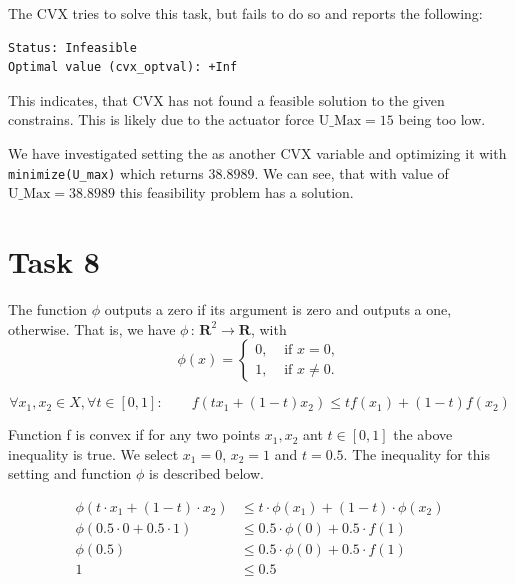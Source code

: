 The CVX tries to solve this task, but fails to do so and reports the following:
\begin{lstlisting}
Status: Infeasible
Optimal value (cvx_optval): +Inf
\end{lstlisting}

This indicates, that CVX has not found a feasible solution to the given constrains. This is likely due to the actuator force $\text{U\_Max}=15$ being too low. 

We have investigated setting the  as another CVX variable and optimizing it with \lstinline{minimize(U_max)} which returns $38.8989$. We can see, that with value of $\text{U\_Max}=38.8989$ this feasibility problem has a solution.

\section{Task 8}
The function $\phi$ outputs a zero if its argument is zero and outputs a one, otherwise. That is, we have $\phi\,:\,{\mathbf R}^2 \rightarrow {\mathbf R}$, with $$\phi(x) = \left\{ \begin{array}{ll} 0,  & \text{ if } x = 0, \\ 1, & \text{ if }x \neq 0. \end{array} \right.$$


\begin{equation}
	\forall x_1, x_2 \in X, \forall t \in [0, 1]: \qquad f(tx_1+(1-t)x_2)\leq t f(x_1)+(1-t)f(x_2)
\end{equation}

Function f is convex if for any two points $x_{1}, x_{2}$ ant $t\in[0, 1]$ the above inequality is true. We select $x_{1} = 0$, $x_{2} = 1$ and $t=0.5$. The inequality for this setting and function $\phi$ is described below.

\begin{equation}
\begin{split}
	\phi(t \cdot x_1+(1-t) \cdot x_2) &\leq t \cdot \phi(x_1)+(1-t) \cdot \phi(x_2)\\
	\phi(0.5 \cdot 0 + 0.5 \cdot 1) &\leq 0.5 \cdot \phi(0) + 0.5 \cdot f(1)\\
	\phi(0.5) &\leq 0.5 \cdot \phi(0) + 0.5 \cdot f(1)\\
	1 &\leq 0.5
\end{split}
\end{equation}

